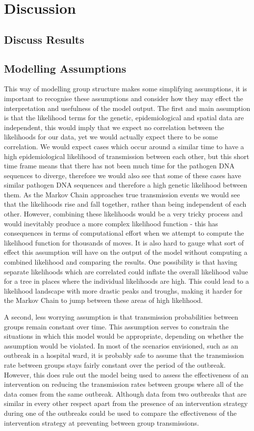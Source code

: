 \documentclass[11pt,a4paper]{report}
\begin{document}
\chapter{Discussion}
\section{Discuss Results}
\section{Modelling Assumptions}
This way of modelling group structure makes some simplifying assumptions, it is important to recognise these assumptions and consider how they may effect the interpretation and usefulness of the model output. The first and main assumption is that the likelihood terms for the genetic, epidemiological and spatial data are independent, this would imply that we expect no correlation between the likelihoods for our data, yet we would actually expect there to be some correlation. We would expect cases which occur around a similar time to have a high epidemiological likelihood of transmission between each other, but this short time frame means that there has not been much time for the pathogen DNA sequences to diverge, therefore we would also see that some of these cases have similar pathogen DNA sequences and therefore a high genetic likelihood between them. As the Markov Chain approaches true transmission events we would see that the likelihoods rise and fall together, rather than being independent of each other. However, combining these likelihoods would be a very tricky process and would inevitably produce a more complex likelihood function - this has consequences in terms of computational effort when we attempt to compute the likelihood function for thousands of moves. It is also hard to gauge what sort of effect this assumption will have on the output of the model without computing a combined likelihood and comparing the results. One possibility is that having separate likelihoods which are correlated could inflate the overall likelihood value for a tree in places where the individual likelihoods are high. This could lead to a likelihood landscape with more drastic peaks and troughs, making it harder for the Markov Chain to jump between these areas of high likelihood.

A second, less worrying assumption is that transmission probabilities between groups remain constant over time. This assumption serves to constrain the situations in which this model would be appropriate, depending on whether the assumption would be violated. In most of the scenarios envisioned, such as an outbreak in a hospital ward, it is probably safe to assume that the transmission rate between groups stays fairly constant over the period of the outbreak. However, this does rule out the model being used to assess the effectiveness of an intervention on reducing the transmission rates between groups where all of the data comes from the same outbreak. Although data from two outbreaks that are similar in every other respect apart from the presence of an intervention strategy during one of the outbreaks could be used to compare the effectiveness of the intervention strategy at preventing between group transmissions.
\end{document}
